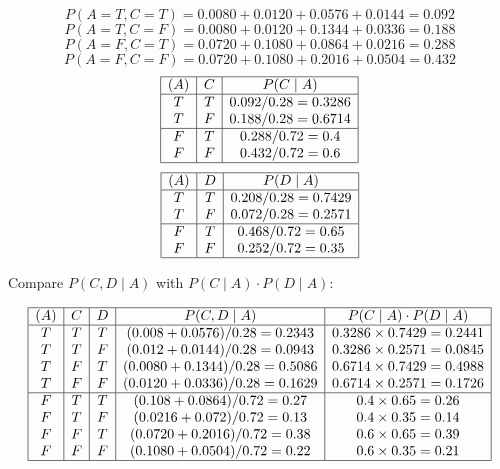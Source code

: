 \documentclass[12pt]{article}
\begin{document}
\begin{enumerate}[font=\Large,label=(\alph*)]
	      $$ P(A = T, C = T) = 0.0080 + 0.0120 + 0.0576 + 0.0144 = 0.092 $$
	      $$ P(A = T, C = F) = 0.0080 + 0.0120 + 0.1344 + 0.0336 = 0.188 $$
	      $$ P(A = F, C = T) = 0.0720 + 0.1080 + 0.0864 + 0.0216 = 0.288 $$
	      $$ P(A = F, C = F) = 0.0720 + 0.1080 + 0.2016 + 0.0504 = 0.432 $$
	      $$
		      \begin{array}{|c|c|c|}
			      \hline
			      (A) & C & P(C \mid A)       \\
			      \hline
			      T   & T & 0.092/0.28=0.3286 \\
			      T   & F & 0.188/0.28=0.6714 \\
			      \hline
			      F   & T & 0.288/0.72=0.4    \\
			      F   & F & 0.432/0.72=0.6    \\
			      \hline
		      \end{array}
	      $$
	      $$
		      \begin{array}{|c|c|c|}
			      \hline
			      (A) & D & P(D \mid A)       \\
			      \hline
			      T   & T & 0.208/0.28=0.7429 \\
			      T   & F & 0.072/0.28=0.2571 \\
			      \hline
			      F   & T & 0.468/0.72=0.65   \\
			      F   & F & 0.252/0.72=0.35   \\
			      \hline
		      \end{array}
	      $$

	      Compare $ P(C, D \mid A) $ with $ P(C \mid A) \cdot P(D \mid A) $:

	      $$
		      \begin{array}{|c|c|c|c|c|}
			      \hline
			      (A) & C & D & P(C, D \mid A)                & P(C \mid A) \cdot P(D \mid A) \\
			      \hline
			      T   & T & T & (0.008+0.0576)/0.28 = 0.2343  & 0.3286 \times 0.7429 = 0.2441 \\
			      T   & T & F & (0.012+0.0144)/0.28 = 0.0943  & 0.3286 \times 0.2571 = 0.0845 \\
			      T   & F & T & (0.0080+0.1344)/0.28 = 0.5086 & 0.6714 \times 0.7429 = 0.4988 \\
			      T   & F & F & (0.0120+0.0336)/0.28 = 0.1629 & 0.6714 \times 0.2571 = 0.1726 \\
			      \hline
			      F   & T & T & (0.108+0.0864)/0.72 = 0.27    & 0.4 \times 0.65 = 0.26        \\
			      F   & T & F & (0.0216+0.072)/0.72 = 0.13    & 0.4 \times 0.35 = 0.14        \\
			      F   & F & T & (0.0720+0.2016)/0.72 = 0.38   & 0.6 \times 0.65 = 0.39        \\
			      F   & F & F & (0.1080+0.0504)/0.72 = 0.22   & 0.6 \times 0.35 = 0.21        \\
			      \hline
		      \end{array}
	      $$


\end{enumerate}
\end{document}
